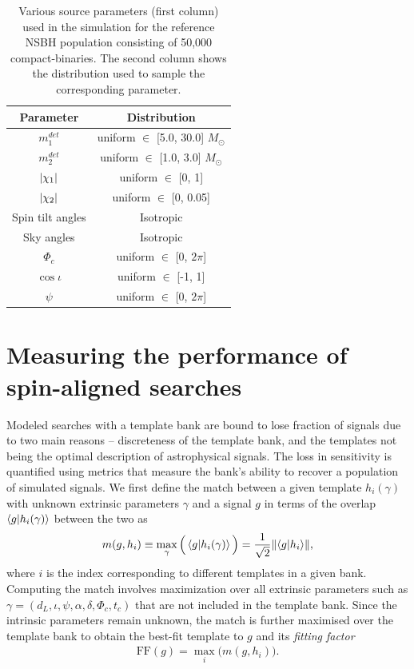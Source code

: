 \begin{table}
    \centering
    \begin{tabular}{c|c}
        Parameter &  Distribution\\
        \hline
        \hline
        $ m_{1}^{det} $ & uniform $\in$ [5.0, 30.0]  $ M_{\odot}$ \\
        \hline
        $ m_{2}^{det} $ & uniform $\in$ [1.0, 3.0] $ M_{\odot} $\\
        \hline 
        $\abs{\chi_{1}}$ & uniform $\in$ [0, 1] \\
        \hline
        $\abs{\chi_{2}}$ & uniform $\in$ [0, 0.05] \\
        \hline
        Spin tilt angles & Isotropic\\
        \hline 
        Sky angles & Isotropic \\
        \hline
        $\Phi_c$ & uniform $\in$ [0, $2\pi$]\\
        \hline
        $\cos{\iota}$ & uniform $\in$ [-1, 1] \\
        \hline
        $\psi$ & uniform $\in$ [0, $2\pi$]
    \end{tabular}
    \caption{ Various source parameters (first column) used in the simulation for the reference NSBH population consisting of 50,000 compact-binaries. The second column shows the distribution used to sample the corresponding parameter.}
    \label{tab:priors}
\end{table}

\section{Measuring the performance of spin-aligned searches}\label{sec:metrics}
Modeled searches with a template bank are bound to lose fraction of signals due to two main reasons -- discreteness of the template bank, and the templates not being the optimal description of astrophysical signals. The loss in sensitivity is quantified using metrics that measure the bank's ability to recover a population of simulated signals. We first define the match between a given template $h_i(\gamma)$ with unknown extrinsic parameters $\gamma$ and a signal $g$ in terms of the overlap $\braket{g|h_i({\gamma})}$ between the two as
\begin{align}
    m(g, h_i) \equiv \mathop{\max}_{\gamma}\Big( \braket{g|h_i(\gamma)} \Big) = \dfrac{1}{\sqrt{2}}\norm{\braket{g|h_i}},
    \label{eq:overlap}
\end{align}
where $i$ is the index corresponding to different templates in a given bank. Computing the match involves maximization over all extrinsic parameters such as $\gamma = (d_L, \iota, \psi, \alpha, \delta, \Phi_c, t_c)$ that are not included in the template bank. Since the intrinsic parameters remain unknown, the match is further maximised over the template bank to obtain the best-fit template to $g$ and its \textit{fitting factor} 
\begin{align}
    \text{FF}(g) = \max_{i} \big(m(g,h_i)\big).
    \label{Eq:FF}
\end{align}

